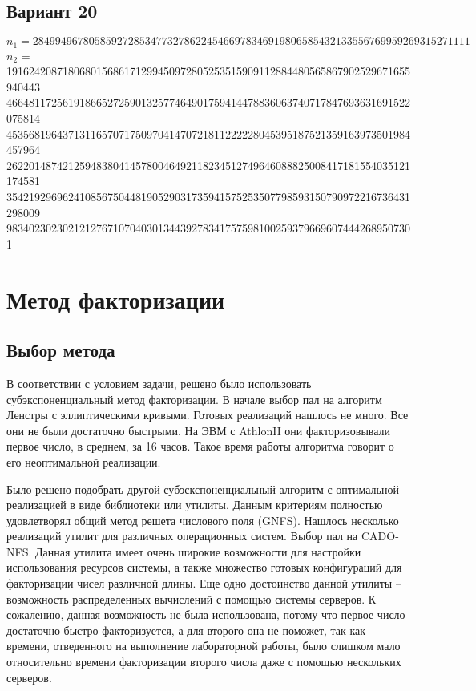 \documentclass[a4paper,12pt]{article}
\begin{document}
\subsection{Вариант 20}
$n_1 = 284994967805859272853477327862245466978346919806585432133556769959269315271111$ \\
$n_2$ =
        191624208718068015686171299450972805253515909112884480565867902529671655940443 \\
        466481172561918665272590132577464901759414478836063740717847693631691522075814 \\
        453568196437131165707175097041470721811222228045395187521359163973501984457964 \\
        262201487421259483804145780046492118234512749646088825008417181554035121174581 \\
        354219296962410856750448190529031735941575253507798593150790972216736431298009 \\
        9834023023021212767107040301344392783417575981002593796696074442689507301

\section{Метод факторизации}

\subsection{Выбор метода}

В соответствии с условием задачи, решено было использовать субэкспоненциальный метод
факторизации. В начале выбор пал на алгоритм Ленстры с эллиптическими кривыми.
Готовых реализаций нашлось не много. Все они не были достаточно быстрыми.
На ЭВМ с AthlonII они факторизовывали первое число, в среднем, за 16 часов.
Такое время работы алгоритма говорит о его неоптимальной реализации.

Было решено подобрать другой субэскспоненциальный алгоритм с
оптимальной реализацией в виде библиотеки или утилиты. Данным
критериям полностью удовлетворял общий метод решета числового
поля (GNFS). Нашлось несколько реализаций утилит для различных операционных
систем. Выбор пал на CADO-NFS. Данная утилита имеет очень широкие возможности для
настройки использования ресурсов системы, а также множество готовых конфигураций
для факторизации чисел различной длины. Еще одно достоинство данной утилиты --
возможность распределенных вычислений с помощью системы серверов. К сожалению,
данная возможность не была использована, потому что первое число достаточно
быстро факторизуется, а для второго она не поможет, так как времени, отведенного
на выполнение лабораторной работы, было слишком мало относительно времени факторизации
второго числа даже с помощью нескольких серверов.
\end{document}
